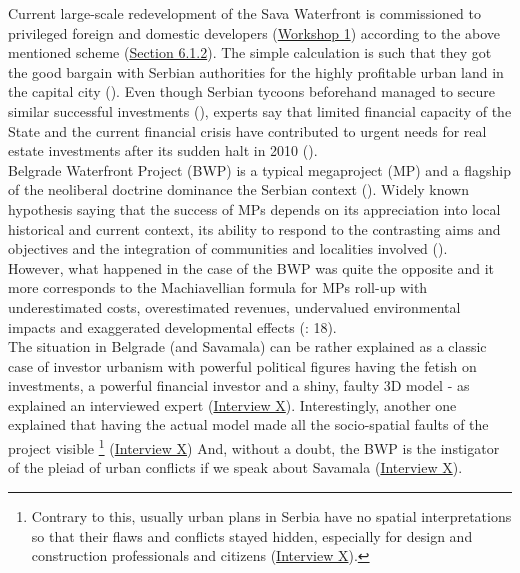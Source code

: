 \documentclass[11pt]{report}
\begin{document}
Current large-scale redevelopment of the Sava Waterfront is commissioned to privileged foreign and domestic developers
(\href{Expert Workshop}{Workshop 1})
according to the above mentioned scheme (\href{Section 6.1.2}{Section 6.1.2}).
The simple calculation is such that they got the good bargain with Serbian authorities for the highly profitable urban land in the capital city (\cite{ref media}).
Even though Serbian tycoons beforehand managed to secure similar successful investments (\cite{ref slavka smederevo}), experts say that limited financial capacity of the State and  the  current  financial  crisis  have  contributed  to urgent needs for real estate investments after its sudden halt in 2010 (\citealt{doytchinov_urban_2015}).
\\

Belgrade Waterfront Project (BWP) is a typical megaproject (MP) and a flagship of the neoliberal doctrine dominance the Serbian context (\citealt{harvey_rebel_2012}).
Widely known hypothesis saying that the success of MPs depends on its appreciation into local historical and current context, its ability to respond to the contrasting aims and objectives and the integration of communities and localities involved (\cite{Hoyle 2000}).
\\

However, what happened in the case of the BWP was quite the opposite and it more corresponds to the Machiavellian formula for MPs roll-up with underestimated costs, overestimated
revenues, undervalued environmental impacts and exaggerated developmental effects (\cite{Flyvbjerg2005}: 18).
\\

The situation in Belgrade (and Savamala) can be rather explained as a classic case of investor urbanism with powerful political figures having the fetish on investments, a powerful financial investor and a shiny, faulty 3D model - as explained an interviewed expert
(\href{InterviewX}{Interview X}).
Interestingly, another one explained that having the actual model made all the socio-spatial faults of the project visible
\footnote{Contrary to this, usually urban plans in Serbia have no spatial interpretations so that their flaws and conflicts stayed hidden, especially for design and construction professionals and citizens (\href{InterviewX}{Interview X}).}
(\href{InterviewX}{Interview X})
And, without a doubt, the BWP is the instigator of the pleiad of urban conflicts if we speak about Savamala (\href{InterviewX}{Interview X}).
\\
\end{document}
